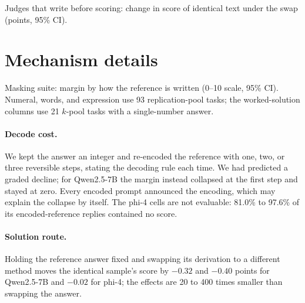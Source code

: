 \begin{table}[htbp]
\centering
\caption{Judges that write before scoring: change in score of identical text under the swap (points, 95\% CI).\pre}
\label{tab:r2b}
\footnotesize
\setlength{\tabcolsep}{3pt}
\begin{adjustbox}{max width=\linewidth}\end{adjustbox}
\end{table}

\FloatBarrier
\section{Mechanism details}
\label{app:mechanism}

\begin{table}[htbp]
\centering
\caption{Masking suite: margin by how the reference is written (0--10 scale, 95\% CI). Numeral, words, and expression use 93 replication-pool tasks; the worked-solution columns use 21 $k$-pool tasks with a single-number answer.\pre}
\label{tab:masking}
\footnotesize
\setlength{\tabcolsep}{3pt}
\begin{adjustbox}{max width=\linewidth}\end{adjustbox}
\end{table}

\paragraph{Decode cost.}
We kept the answer an integer and re-encoded the reference with one, two, or three reversible steps, stating the decoding rule each time. We had predicted a graded decline; for Qwen2.5-7B the margin instead collapsed at the first step and stayed at zero. Every encoded prompt announced the encoding, which may explain the collapse by itself. The phi-4 cells are not evaluable: 81.0\% to 97.6\% of its encoded-reference replies contained no score.

\paragraph{Solution route.}
Holding the reference answer fixed and swapping its derivation to a different method moves the identical sample's score by $-0.32$ and $-0.40$ points for Qwen2.5-7B and $-0.02$ for phi-4; the effects are 20 to 400 times smaller than swapping the answer.

